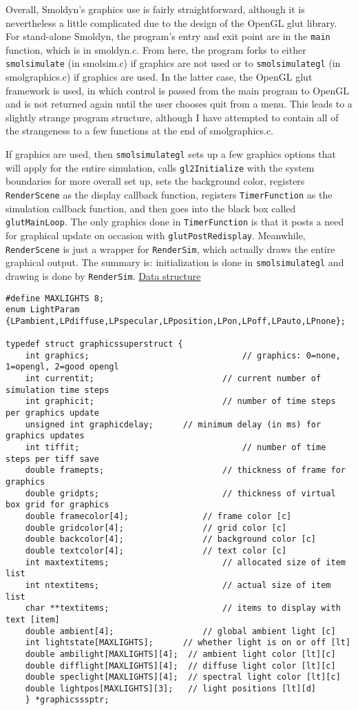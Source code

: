 \documentclass {book}
\begin{document}
Overall, Smoldyn's graphics use is fairly straightforward, although it is nevertheless a little complicated due to the design of the OpenGL glut library. For stand-alone Smoldyn, the program's entry and exit point are in the \texttt{main} function, which is in smoldyn.c. From here, the program forks to either \texttt{smolsimulate} (in smolsim.c) if graphics are not used or to \texttt{smolsimulategl} (in smolgraphics.c) if graphics are used. In the latter case, the OpenGL glut framework is used, in which control is passed from the main program to OpenGL and is not returned again until the user chooses quit from a menu. This leads to a slightly strange program structure, although I have attempted to contain all of the strangeness to a few functions at the end of smolgraphics.c.

If graphics are used, then \texttt{smolsimulategl} sets up a few graphics options that will apply for the entire simulation, calls \texttt{gl2Initialize} with the system boundaries for more overall set up, sets the background color, registers \texttt{RenderScene} as the display callback function, registers \texttt{TimerFunction} as the simulation callback function, and then goes into the black box called \texttt{glutMainLoop}. The only graphics done in \texttt{TimerFunction} is that it posts a need for graphical update on occasion with \texttt{glutPostRedisplay}. Meanwhile, \texttt{RenderScene} is just a wrapper for \texttt{RenderSim}, which actually draws the entire graphical output. The summary is: initialization is done in \texttt{smolsimulategl} and drawing is done by \texttt{RenderSim}.
\newline
\newline
\underline{Data structure}

\begin{lstlisting}
#define MAXLIGHTS 8;
enum LightParam {LPambient,LPdiffuse,LPspecular,LPposition,LPon,LPoff,LPauto,LPnone};

typedef struct graphicssuperstruct {
	int graphics;								// graphics: 0=none, 1=opengl, 2=good opengl
	int currentit;							// current number of simulation time steps
	int graphicit;							// number of time steps per graphics update
	unsigned int graphicdelay;		// minimum delay (in ms) for graphics updates
	int tiffit;									// number of time steps per tiff save
	double framepts;						// thickness of frame for graphics
	double gridpts;							// thickness of virtual box grid for graphics
	double framecolor[4];				// frame color [c]
	double gridcolor[4];				// grid color [c]
	double backcolor[4];				// background color [c]
	double textcolor[4];				// text color [c]
	int maxtextitems;						// allocated size of item list
	int ntextitems;							// actual size of item list
	char **textitems;						// items to display with text [item]
	double ambient[4];					// global ambient light [c]
	int lightstate[MAXLIGHTS];		// whether light is on or off [lt]
	double ambilight[MAXLIGHTS][4];	 // ambient light color [lt][c]
	double difflight[MAXLIGHTS][4];	 // diffuse light color [lt][c]
	double speclight[MAXLIGHTS][4];	 // spectral light color [lt][c]
	double lightpos[MAXLIGHTS][3];	 // light positions [lt][d]
	} *graphicsssptr;
\end{lstlisting}
\end{document}
